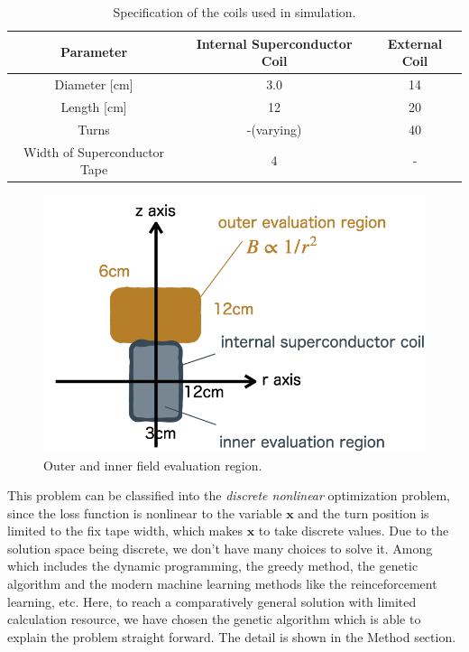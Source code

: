 \begin{table}[H]
  \centering
  \caption{Specification of the coils used in simulation.}
  \label{tab:optimizationOfCoilSpecification}
  \begin{tabular}{ccc}\hline\hline
    Parameter & Internal Superconductor Coil & External Coil \\\hline
    Diameter [cm] & 3.0 & 14\\\hline
    Length [cm] & 12 & 20 \\\hline
    Turns & -(varying) & 40 \\\hline
    Width of Superconductor Tape & 4 & -\\\hline\hline
  \end{tabular}
\end{table}
\begin{figure}[H]
  \includegraphics[width=18cm, bb=9 9 900 610]{./section4Optimal/evaluationRegion.png}
  \caption{Outer and inner field evaluation region.}
  \label{fig:evaluationRegion}
\end{figure}

This problem can be classified into the {\sl discrete nonlinear} optimization problem,
since the loss function is nonlinear to the variable $\mathbf{x}$ and
the turn position is limited to the fix tape width, which makes $\mathbf{x}$ to take discrete values.
Due to the solution space being discrete, we don't have many choices to solve it.
Among which includes the dynamic programming, the greedy method, the genetic algorithm and the modern machine learning methods like the reinceforcement learning, etc.
Here, to reach a comparatively general solution with limited calculation resource,
we have chosen the genetic algorithm which is able to explain the problem straight forward.
The detail is shown in the Method section.


